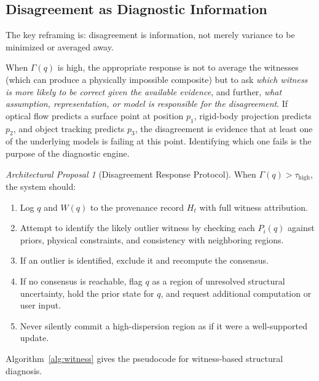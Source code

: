 \documentclass[12pt,a4paper]{article}
\theoremstyle{plain}
\theoremstyle{definition}
\theoremstyle{remark}
\newtheorem{proposal}[theorem]{Architectural Proposal}
\begin{document}
\subsection{Disagreement as Diagnostic Information}

The key reframing is: disagreement is information, not merely variance to be minimized or averaged away.

When $\Gamma(q)$ is high, the appropriate response is not to average the witnesses (which can produce a physically impossible composite) but to ask \textit{which witness is more likely to be correct given the available evidence}, and further, \textit{what assumption, representation, or model is responsible for the disagreement}. If optical flow predicts a surface point at position $p_1$, rigid-body projection predicts $p_2$, and object tracking predicts $p_3$, the disagreement is evidence that at least one of the underlying models is failing at this point. Identifying which one fails is the purpose of the diagnostic engine.

\begin{proposal}[Disagreement Response Protocol]
When $\Gamma(q) > \tau_{\text{high}}$, the system should:
\begin{enumerate}[leftmargin=2em,itemsep=0pt]
\item Log $q$ and $W(q)$ to the provenance record $H_t$ with full witness attribution.
\item Attempt to identify the likely outlier witness by checking each $P_i(q)$ against priors, physical constraints, and consistency with neighboring regions.
\item If an outlier is identified, exclude it and recompute the consensus.
\item If no consensus is reachable, flag $q$ as a region of unresolved structural uncertainty, hold the prior state for $q$, and request additional computation or user input.
\item Never silently commit a high-dispersion region as if it were a well-supported update.
\end{enumerate}
\end{proposal}

Algorithm~\ref{alg:witness} gives the pseudocode for witness-based structural diagnosis.
\end{document}
